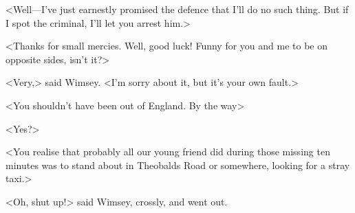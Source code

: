 <Well—I've just earnestly promised the defence that I'll do no such thing. But if I spot the criminal, I'll let you arrest him.>

<Thanks for small mercies. Well, good luck! Funny for you and me to be on opposite sides, isn't it?>

<Very,> said Wimsey. <I'm sorry about it, but it's your own fault.>

<You shouldn't have been out of England. By the way\longdash>

<Yes?>

<You realise that probably all our young friend did during those missing ten minutes was to stand about in Theobalds Road or somewhere, looking for a stray taxi.>

<Oh, shut up!> said Wimsey, crossly, and went out.
